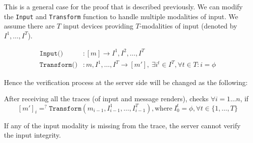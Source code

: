This is a general case for the proof that is described previously. We can modify the \texttt{Input} and \texttt{Transform} function to handle multiple modalities of input. We assume there are $T$ input devices providing $T$-modalities of input (denoted by $I^1, \ldots, I^T$).

\begin{align*}
\texttt{Input()}&:[m]\rightarrow I^1, I^2, \ldots, I^T \\
\texttt{Transform()}&:m,I^1,\ldots, I^T \rightarrow [m'],\ \exists i^t\in I^T, \forall t \in T :i=\phi
\end{align*}

Hence the verification process at the server side will be changed as the following:

 After receiving all the traces (of input and message renders), \server checks $\forall i=1\ldots n$, if 
$$[m']_i =^? \texttt{Transform}(m_{i-1}, I^1_{i-1},\ldots, I^T_{i-1}), \text{where}\ I^t_0=\phi, \forall t \in \{1,\ldots, T\}$$ 

If any of the input modality is missing from the trace, the server cannot verify the input integrity. 